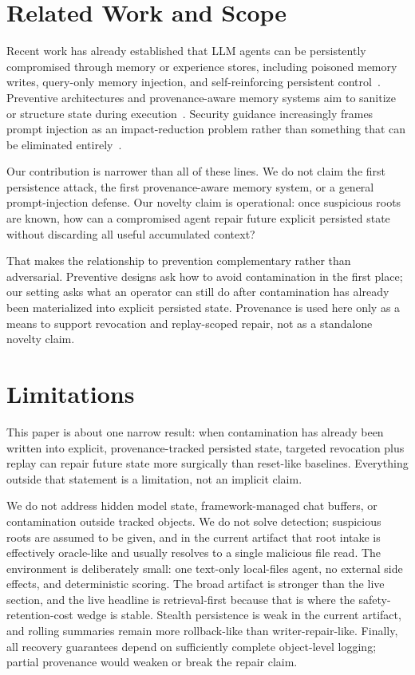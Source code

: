 \documentclass[letterpaper,twocolumn,10pt]{article}
\begin{document}
\section{Related Work and Scope}

Recent work has already established that LLM agents can be persistently compromised through memory or experience stores, including poisoned memory writes, query-only memory injection, and self-reinforcing persistent control~\cite{agentpoison2024,minja2025,zombie2026,memorygraft2025}. Preventive architectures and provenance-aware memory systems aim to sanitize or structure state during execution~\cite{agentsys2026,agentsentry2026,tiermem2026}. Security guidance increasingly frames prompt injection as an impact-reduction problem rather than something that can be eliminated entirely~\cite{owasp2025,ncsc2025}.

Our contribution is narrower than all of these lines. We do not claim the first persistence attack, the first provenance-aware memory system, or a general prompt-injection defense. Our novelty claim is operational: once suspicious roots are known, how can a compromised agent repair future explicit persisted state without discarding all useful accumulated context?

That makes the relationship to prevention complementary rather than adversarial. Preventive designs ask how to avoid contamination in the first place; our setting asks what an operator can still do after contamination has already been materialized into explicit persisted state. Provenance is used here only as a means to support revocation and replay-scoped repair, not as a standalone novelty claim.

\section{Limitations}

This paper is about one narrow result: when contamination has already been written into explicit, provenance-tracked persisted state, targeted revocation plus replay can repair future state more surgically than reset-like baselines. Everything outside that statement is a limitation, not an implicit claim.

We do not address hidden model state, framework-managed chat buffers, or contamination outside tracked objects. We do not solve detection; suspicious roots are assumed to be given, and in the current artifact that root intake is effectively oracle-like and usually resolves to a single malicious file read. The environment is deliberately small: one text-only local-files agent, no external side effects, and deterministic scoring. The broad artifact is stronger than the live section, and the live headline is retrieval-first because that is where the safety-retention-cost wedge is stable. Stealth persistence is weak in the current artifact, and rolling summaries remain more rollback-like than writer-repair-like. Finally, all recovery guarantees depend on sufficiently complete object-level logging; partial provenance would weaken or break the repair claim.
\end{document}
